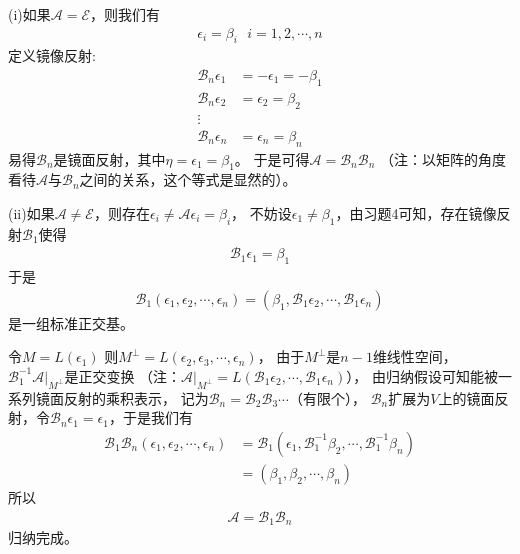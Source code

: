 \documentclass{article}
\begin{document}
(i)如果$\mathscr{A} = \mathscr{E}$，则我们有
\begin{align*}
  \epsilon_i = \beta_i \ \ \ i = 1, 2, \cdots, n
\end{align*}
定义镜像反射:
\begin{align*}
  \mathscr{B}_n \epsilon_1 & = - \epsilon_1 = -\beta_1 \\
  \mathscr{B}_n \epsilon_2 & = \epsilon_2 = \beta_2    \\
  \vdots                                               \\
  \mathscr{B}_n \epsilon_n & = \epsilon_n = \beta_n
\end{align*}
易得$\mathscr{B}_n$是镜面反射，其中$\eta = \epsilon_1 = \beta_1$。
于是可得$\mathscr{A} = \mathscr{B}_n\mathscr{B}_n$
（注：以矩阵的角度看待$\mathscr{A}$与$\mathscr{B}_n$之间的关系，这个等式是显然的）。

(ii)如果$\mathscr{A} \neq \mathscr{E}$，则存在$\epsilon_i \neq \mathscr{A} \epsilon_i = \beta_i$，
不妨设$\epsilon_1 \neq \beta_1$，由习题4可知，存在镜像反射$\mathscr{B}_1$使得
\begin{align*}
  \mathscr{B}_1 \epsilon_1 = \beta_1
\end{align*}
于是
\begin{align*}
  \mathscr{B}_1(\epsilon_1, \epsilon_2, \cdots, \epsilon_n)
  = (\beta_1, \mathscr{B}_1 \epsilon_2, \cdots, \mathscr{B}_1 \epsilon_n)
\end{align*}
是一组标准正交基。

令$M = L(\epsilon_1)$
则$M^{\bot} = L(\epsilon_2, \epsilon_3, \cdots, \epsilon_n)$，
由于$M^{\bot}$是$n - 1$维线性空间，
$\mathscr{B}_1^{-1}\mathscr{A}|_{M^{\bot}}$是正交变换
（注：$\mathscr{A}|_{M^{\bot}} = L(\mathscr{B}_1 \epsilon_2, \cdots, \mathscr{B}_1 \epsilon_n)$），
由归纳假设可知能被一系列镜面反射的乘积表示，
记为$\mathscr{B}_{n} = \mathscr{B}_{2} \mathscr{B}_{3} \cdots$（有限个），
$\mathscr{B}_{n}$扩展为$V$上的镜面反射，令$\mathscr{B}_n \epsilon_1 = \epsilon_1$，于是我们有
\begin{align*}
  \mathscr{B}_1 \mathscr{B}_n (\epsilon_1, \epsilon_2, \cdots, \epsilon_n)
   & = \mathscr{B}_1(\epsilon_1, \mathscr{B}^{-1}_1 \beta_2, \cdots, \mathscr{B}^{-1}_1 \beta_n) \\
   & = (\beta_1, \beta_2, \cdots, \beta_n)
\end{align*}
所以
\begin{align*}
  \mathscr{A} = \mathscr{B}_1 \mathscr{B}_n
\end{align*}
归纳完成。
\end{document}
